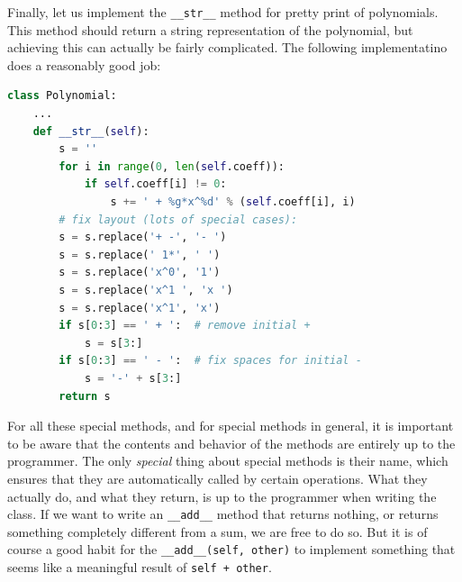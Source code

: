 \documentclass[graybox,envcountchap,sectrefs,final]{svmonodo}
\begin{document}
Finally, let us implement the \Verb!__str__! method for pretty print of polynomials. This method should return a
string representation of the polynomial, but achieving this can actually be fairly complicated. The following
implementatino does a reasonably good job:
\begin{lstlisting}[language=Python,style=blue1]
class Polynomial:
    ...
    def __str__(self):
        s = ''
        for i in range(0, len(self.coeff)):
            if self.coeff[i] != 0:
                s += ' + %g*x^%d' % (self.coeff[i], i)
        # fix layout (lots of special cases):
        s = s.replace('+ -', '- ')
        s = s.replace(' 1*', ' ')
        s = s.replace('x^0', '1')
        s = s.replace('x^1 ', 'x ')
        s = s.replace('x^1', 'x')
        if s[0:3] == ' + ':  # remove initial +
            s = s[3:]
        if s[0:3] == ' - ':  # fix spaces for initial -
            s = '-' + s[3:]
        return s
\end{lstlisting}
For all these special methods, and for special methods in general, it is important to be aware that the contents and
behavior of the methods are entirely up to the programmer. The only \emph{special} thing about special methods is their
name, which ensures that they are automatically called by certain operations. What they actually do, and what they return,
is up to the programmer when writing the class. If we want to write an \Verb!__add__! method that returns nothing, or
returns something completely different from a sum, we are free to do so. But it is of course a good habit for the
\Verb!__add__(self, other)! to implement something that seems like a meaningful result of \texttt{self + other}.
\end{document}
